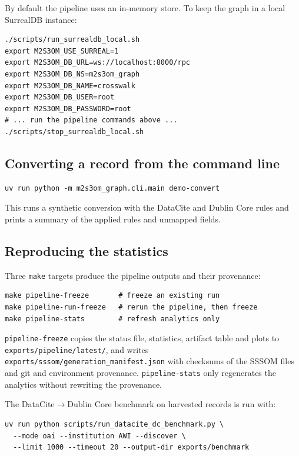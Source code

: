 \documentclass[10pt,twocolumn,a4paper]{extarticle}
\begin{document}
By default the pipeline uses an in-memory store. To keep the graph in a
local SurrealDB instance:

\begin{lstlisting}
./scripts/run_surrealdb_local.sh
export M2S3OM_USE_SURREAL=1
export M2S3OM_DB_URL=ws://localhost:8000/rpc
export M2S3OM_DB_NS=m2s3om_graph
export M2S3OM_DB_NAME=crosswalk
export M2S3OM_DB_USER=root
export M2S3OM_DB_PASSWORD=root
# ... run the pipeline commands above ...
./scripts/stop_surrealdb_local.sh
\end{lstlisting}

\subsection{Converting a record from the command line}

\begin{lstlisting}
uv run python -m m2s3om_graph.cli.main demo-convert
\end{lstlisting}

This runs a synthetic conversion with the DataCite and Dublin Core rules
and prints a summary of the applied rules and unmapped fields.

\subsection{Reproducing the statistics}

Three \texttt{make} targets produce the pipeline outputs and their
provenance:

\begin{lstlisting}
make pipeline-freeze       # freeze an existing run
make pipeline-run-freeze   # rerun the pipeline, then freeze
make pipeline-stats        # refresh analytics only
\end{lstlisting}

\texttt{pipeline-freeze} copies the status file, statistics, artifact table
and plots to \texttt{exports/pipeline/latest/}, and writes
\texttt{exports/sssom/generation\_manifest.json} with checksums of the SSSOM
files and git and environment provenance. \texttt{pipeline-stats} only
regenerates the analytics without rewriting the provenance.

The DataCite$\to$Dublin Core benchmark on harvested records is run with:

\begin{lstlisting}
uv run python scripts/run_datacite_dc_benchmark.py \
  --mode oai --institution AWI --discover \
  --limit 1000 --timeout 20 --output-dir exports/benchmark
\end{lstlisting}
\end{document}
